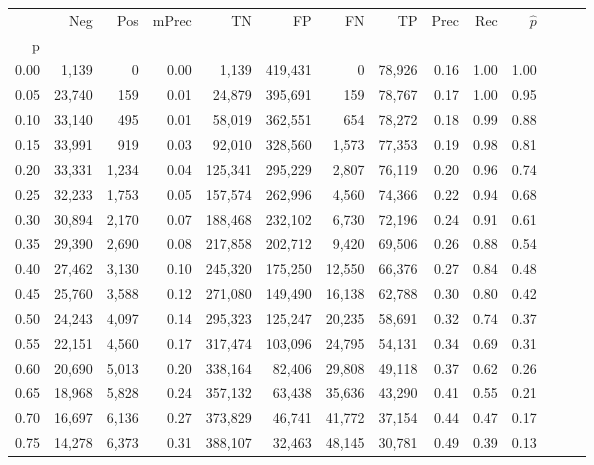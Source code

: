 \begin{tabular}{rrrrrrrrrrrrrr}
\toprule
{} &     Neg &    Pos & mPrec &       TN &       FP &      FN &      TP &  Prec &   Rec & $\hat{p}$ \\
p    &         &        &       &          &          &         &         &       &       &           \\
\midrule
0.00 &   1,139 &      0 &  0.00 &    1,139 &  419,431 &       0 &  78,926 &  0.16 &  1.00 &      1.00 \\
0.05 &  23,740 &    159 &  0.01 &   24,879 &  395,691 &     159 &  78,767 &  0.17 &  1.00 &      0.95 \\
0.10 &  33,140 &    495 &  0.01 &   58,019 &  362,551 &     654 &  78,272 &  0.18 &  0.99 &      0.88 \\
0.15 &  33,991 &    919 &  0.03 &   92,010 &  328,560 &   1,573 &  77,353 &  0.19 &  0.98 &      0.81 \\
0.20 &  33,331 &  1,234 &  0.04 &  125,341 &  295,229 &   2,807 &  76,119 &  0.20 &  0.96 &      0.74 \\
0.25 &  32,233 &  1,753 &  0.05 &  157,574 &  262,996 &   4,560 &  74,366 &  0.22 &  0.94 &      0.68 \\
0.30 &  30,894 &  2,170 &  0.07 &  188,468 &  232,102 &   6,730 &  72,196 &  0.24 &  0.91 &      0.61 \\
0.35 &  29,390 &  2,690 &  0.08 &  217,858 &  202,712 &   9,420 &  69,506 &  0.26 &  0.88 &      0.54 \\
0.40 &  27,462 &  3,130 &  0.10 &  245,320 &  175,250 &  12,550 &  66,376 &  0.27 &  0.84 &      0.48 \\
0.45 &  25,760 &  3,588 &  0.12 &  271,080 &  149,490 &  16,138 &  62,788 &  0.30 &  0.80 &      0.42 \\
0.50 &  24,243 &  4,097 &  0.14 &  295,323 &  125,247 &  20,235 &  58,691 &  0.32 &  0.74 &      0.37 \\
0.55 &  22,151 &  4,560 &  0.17 &  317,474 &  103,096 &  24,795 &  54,131 &  0.34 &  0.69 &      0.31 \\
0.60 &  20,690 &  5,013 &  0.20 &  338,164 &   82,406 &  29,808 &  49,118 &  0.37 &  0.62 &      0.26 \\
0.65 &  18,968 &  5,828 &  0.24 &  357,132 &   63,438 &  35,636 &  43,290 &  0.41 &  0.55 &      0.21 \\
0.70 &  16,697 &  6,136 &  0.27 &  373,829 &   46,741 &  41,772 &  37,154 &  0.44 &  0.47 &      0.17 \\
0.75 &  14,278 &  6,373 &  0.31 &  388,107 &   32,463 &  48,145 &  30,781 &  0.49 &  0.39 &      0.13 \\

\end{tabular}
